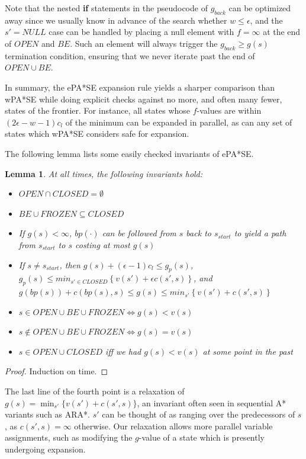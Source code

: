\documentclass[letterpaper]{article}
\newtheorem{lemma}{Lemma}
\begin{document}
Note that the nested \textbf{if} statements in the pseudocode of $g_{back}$ can be optimized away since we usually know in advance of the search whether $w \le \epsilon$, and the $s' = NULL$ case can be handled by placing a null element with $f = \infty$ at the end of $OPEN$ and $BE$. Such an element will always trigger the $g_{back} \ge g(s)$ termination condition, ensuring that we never iterate past the end of $OPEN\cup BE$.

In summary, the ePA*SE expansion rule yields a sharper comparison than wPA*SE while doing explicit checks against no more, and often many fewer, states of the frontier. For instance, all states whose $f$-values are within $(2\epsilon-w-1)c_l$ of the minimum can be expanded in parallel, as can any set of states which wPA*SE considers safe for expansion.

The following lemma lists some easily checked invariants of ePA*SE.

\begin{lemma}
\label{lem:prop}
At all times, the following invariants hold:
\begin{itemize}
\item $OPEN\cap CLOSED = \emptyset$
\item $BE\cup FROZEN \subseteq CLOSED$
\item If $g(s)<\infty$, $bp(\cdot)$ can be followed from $s$ back to $s_{start}$ to yield a path from $s_{start}$ to $s$ costing at most $g(s)$
\item If $s\ne s_{start}$, then $g(s) + (\epsilon-1)c_l \le g_p(s)$,
\\$g_p(s) \le min_{s'\in CLOSED}\left\{v(s') + \epsilon c(s',s)\right\}$, and
\\$g(bp(s)) + c(bp(s),s) \le g(s) \le min_{s'}\left\{v(s') + c(s',s)\right\}$
\item $s\in OPEN\cup BE\cup FROZEN \Leftrightarrow g(s) < v(s)$
\item $s\notin OPEN\cup BE\cup FROZEN \Leftrightarrow g(s) = v(s)$
\item $s\in OPEN\cup CLOSED$ iff we had $g(s)<v(s)$ at some point in the past
\end{itemize}
\end{lemma}

\begin{proof}
Induction on time.
\end{proof}

The last line of the fourth point is a relaxation of $g(s) = \min_{s'}\{v(s') + c(s',s)\}$, an invariant often seen in sequential A* variants such as ARA*. $s'$ can be thought of as ranging over the predecessors of $s$, as $c(s',s)=\infty$ otherwise. Our relaxation allows more parallel variable assignments, such as modifying the $g$-value of a state which is presently undergoing expansion.
\end{document}
